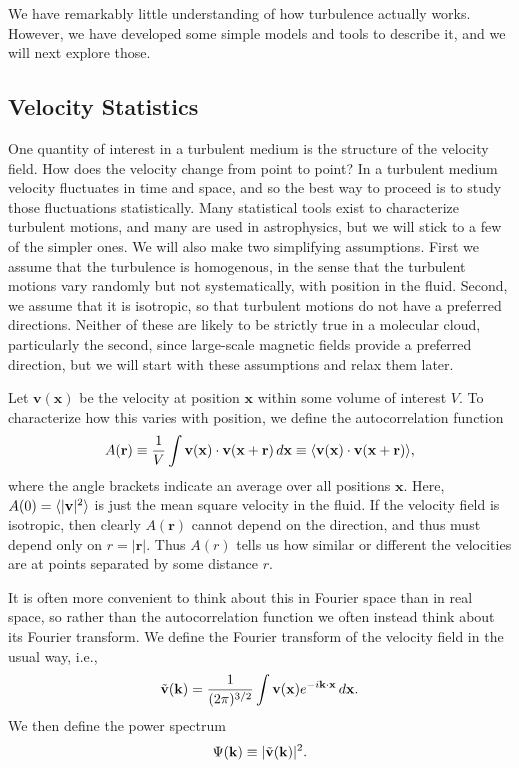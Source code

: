 We have remarkably little understanding of how turbulence actually works. However, we have developed some simple models and tools to describe it, and we will next explore those.

\subsection{Velocity Statistics}

One quantity of interest in a turbulent medium is the structure of the velocity field. How does the velocity change from point to point?  In a turbulent medium velocity fluctuates in time and space, and so the best way to proceed is to study those fluctuations statistically. Many statistical tools exist to characterize turbulent motions, and many are used in astrophysics, but we will stick to a few of the simpler ones. We will also make two simplifying assumptions. First we assume that the turbulence is homogenous, in the sense that the turbulent motions vary randomly but not systematically, with position in the fluid. Second, we assume that it is isotropic, so that turbulent motions do not have a preferred directions. Neither of these are likely to be strictly true in a molecular cloud, particularly the second, since large-scale magnetic fields provide a preferred direction, but we will start with these assumptions and relax them later.

Let $\mathbf{v}(\mathbf{x})$ be the velocity at position $\mathbf{x}$ within some volume of interest $V$. To characterize how this varies with position, we define the autocorrelation function
\begin{equation}
A(\mathbf{r})\equiv \frac{1}{V} \int \mathbf{v}(\mathbf{x})\cdot \mathbf{v}(\mathbf{x}+\mathbf{r}) \, d\mathbf{x} \equiv \langle \mathbf{v}(\mathbf{x}) \cdot \mathbf{v}(\mathbf{x}+\mathbf{r})\rangle,
\end{equation}
where the angle brackets indicate an average over all positions $\mathbf{x}$. Here, $A(0) = \langle|\mathbf{v}|^2\rangle$ is just the mean square velocity in the fluid. If the velocity field is isotropic, then clearly $A(\mathbf{r})$ cannot depend on the direction, and thus must depend only on $r=|\mathbf{r}|$. Thus $A(r)$ tells us how similar or different the velocities are at points separated by some distance $r$.

It is often more convenient to think about this in Fourier space than in real space, so rather than the autocorrelation function we often instead think about its Fourier transform. We define the Fourier transform of the velocity field in the usual way, i.e.,
\begin{equation}
\tilde{\mathbf{v}}(\mathbf{k}) = \frac{1}{(2\pi)^{3/2}}\int \mathbf{v}(\mathbf{x}) e^{-i\mathbf{k}\cdot\mathbf{x}} \,d\mathbf{x}.
\end{equation}
We then define the power spectrum
\begin{equation}
\Psi(\mathbf{k}) \equiv | \tilde{\mathbf{v}}(\mathbf{k})|^2.
\end{equation}

